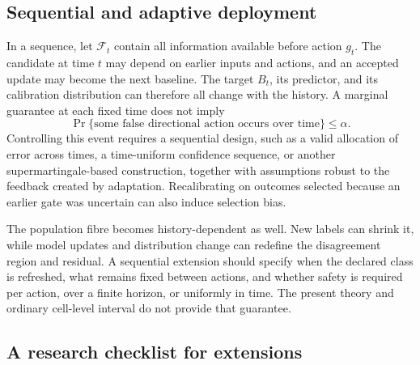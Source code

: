 \subsection{Sequential and adaptive deployment}
\label{fr:subsec-sequential-open}

In a sequence, let $\mathcal F_t$ contain all information available before action $g_t$.  The
candidate at time $t$ may depend on earlier inputs and actions, and an accepted update may become the
next baseline.  The target $B_t$, its predictor, and its calibration distribution can therefore all
change with the history.  A marginal guarantee at each fixed time does not imply
\begin{equation}
  \Pr\{\text{some false directional action occurs over time}\}\le\alpha.
  \label{fr:eq-sequential-family-event}
\end{equation}
Controlling this event requires a sequential design, such as a valid allocation of error across
times, a time-uniform confidence sequence, or another supermartingale-based construction, together
with assumptions robust to the feedback created by adaptation.  Recalibrating on outcomes selected
because an earlier gate was uncertain can also induce selection bias.

The population fibre becomes history-dependent as well.  New labels can shrink it, while model
updates and distribution change can redefine the disagreement region and residual.  A sequential
extension should specify when the declared class is refreshed, what remains fixed between actions,
and whether safety is required per action, over a finite horizon, or uniformly in time.  The present
theory and ordinary cell-level interval do not provide that guarantee.

\subsection{A research checklist for extensions}
\label{fr:subsec-extension-checklist}

